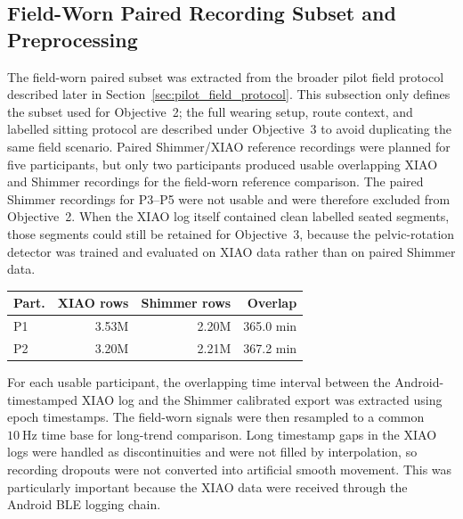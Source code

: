 \subsection{Field-Worn Paired Recording Subset and Preprocessing}\label{sec:field_worn_paired_subset}

The field-worn paired subset was extracted from the broader pilot field protocol described later in Section~\ref{sec:pilot_field_protocol}. This subsection only defines the subset used for Objective~2; the full wearing setup, route context, and labelled sitting protocol are described under Objective~3 to avoid duplicating the same field scenario. Paired Shimmer/XIAO reference recordings were planned for five participants, but only two participants produced usable overlapping XIAO and Shimmer recordings for the field-worn reference comparison. The paired Shimmer recordings for P3--P5 were not usable and were therefore excluded from Objective~2. When the XIAO log itself contained clean labelled seated segments, those segments could still be retained for Objective~3, because the pelvic-rotation detector was trained and evaluated on XIAO data rather than on paired Shimmer data.

\begin{center}
    \scriptsize
    \label{tab:field_worn_paired_subset}
    \begin{tabularx}{\linewidth}{@{}lrrr@{}}
        \toprule
        Part. & XIAO rows & Shimmer rows & Overlap \\
        \midrule
        P1 & 3.53M & 2.20M & 365.0 min \\
        P2 & 3.20M & 2.21M & 367.2 min \\
        \bottomrule
    \end{tabularx}
\end{center}

For each usable participant, the overlapping time interval between the Android-timestamped XIAO log and the Shimmer calibrated export was extracted using epoch timestamps. The field-worn signals were then resampled to a common \(10~\si{\hertz}\) time base for long-trend comparison. Long timestamp gaps in the XIAO logs were handled as discontinuities and were not filled by interpolation, so recording dropouts were not converted into artificial smooth movement. This was particularly important because the XIAO data were received through the Android BLE logging chain.

